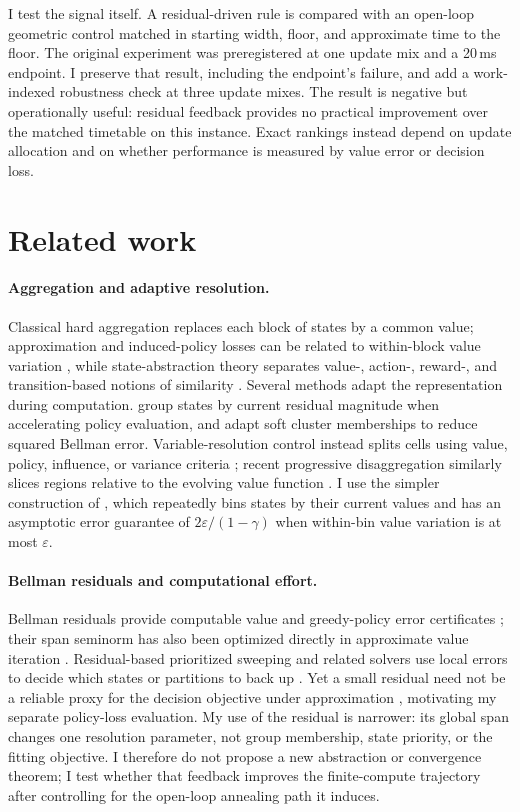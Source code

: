 \documentclass{article}
\begin{document}
I test the signal itself.  A residual-driven rule is compared with an
open-loop geometric control matched in starting width, floor, and approximate
time to the floor.  The original experiment was preregistered at one update mix
and a 20\,ms endpoint.  I preserve that result, including the endpoint's
failure, and add a work-indexed robustness check at three update mixes.  The
result is negative but operationally useful: residual feedback provides no
practical improvement over the matched timetable on this instance.  Exact
rankings instead depend on update allocation and on whether performance is
measured by value error or decision loss.

\section{Related work}

\paragraph{Aggregation and adaptive resolution.}
Classical hard aggregation replaces each block of states by a common value;
approximation and induced-policy losses can be related to within-block value
variation \citep{whitt1978,vanroy2006}, while state-abstraction theory separates
value-, action-, reward-, and transition-based notions of similarity
\citep{li2006}.  Several methods adapt the representation during computation.
\citet{bertsekas1989} group states by current residual magnitude when accelerating
policy evaluation, and \citet{singh1995} adapt soft cluster memberships to reduce
squared Bellman error.  Variable-resolution control instead splits cells using
value, policy, influence, or variance criteria \citep{munos2002}; recent
progressive disaggregation similarly slices regions relative to the evolving
value function \citep{forghieri2024}.  I use the simpler construction of
\citet{chen2021}, which repeatedly bins states by their current values and has an
asymptotic error guarantee of $2\varepsilon/(1-\gamma)$ when within-bin value
variation is at most $\varepsilon$.

\paragraph{Bellman residuals and computational effort.}
Bellman residuals provide computable value and greedy-policy error certificates
\citep{williams1993}; their span seminorm has also been optimized directly in
approximate value iteration \citep{arruda2011}.  Residual-based prioritized
sweeping and related solvers use local errors to decide which states or
partitions to back up \citep{moore1993,wingate2005}.  Yet a small residual need
not be a reliable proxy for the decision objective under approximation
\citep{geist2017}, motivating my separate policy-loss evaluation.  My use of
the residual is narrower: its global span changes one resolution parameter, not
group membership, state priority, or the fitting objective.  I therefore do not
propose a new abstraction or convergence theorem; I test whether that feedback
improves the finite-compute trajectory after controlling for the open-loop
annealing path it induces.
\end{document}
